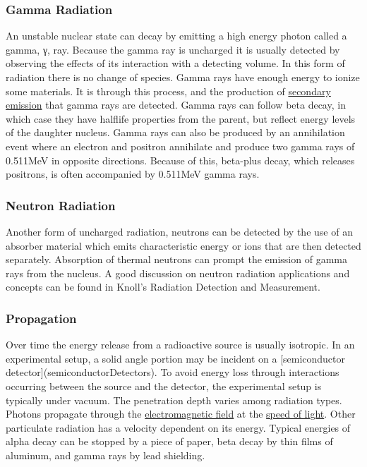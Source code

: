 \documentclass[12pt]{article}
\begin{document}
\begin{doublespacing}
\subsubsection{Gamma Radiation}
An unstable nuclear state can decay by emitting a high energy photon called a gamma, γ, ray. Because the gamma ray is uncharged it is usually detected by observing the effects of its interaction with a detecting volume. In this form of radiation there is no change of species. 
Gamma rays have enough energy to ionize some materials. It is through this process, and the production of \href{https://en.wikipedia.org/wiki/Secondary_emmission}{secondary emission} that gamma rays are detected. Gamma rays can follow beta decay, in which case they have halflife properties from the parent, but reflect energy levels of the daughter nucleus.
Gamma rays can also be produced by an annihilation event where an electron and positron annihilate and produce two gamma rays of 0.511MeV in opposite directions. Because of this, beta-plus decay, which releases positrons, is often accompanied by 0.511MeV gamma rays.

\subsubsection{Neutron Radiation}
Another form of uncharged radiation, neutrons can be detected by the use of an absorber material which emits characteristic energy or ions that are then detected separately.
Absorption of thermal neutrons can prompt the emission of gamma rays from the nucleus.
A good discussion on neutron radiation applications and concepts can be found in Knoll's Radiation Detection and Measurement.

\subsubsection{Propagation}
Over time the energy release from a radioactive source is usually isotropic. In an experimental setup, a solid angle portion may be incident on a [semiconductor detector](semiconductorDetectors). To avoid energy loss through interactions occurring between the source and the detector, the experimental setup is typically under vacuum. 
The penetration depth varies among radiation types. Photons propagate through the \href{https://en.wikipedia.org/wiki/Electromagnetic_field}{electromagnetic field} at the \href{https://en.wikipedia.org/wiki/Speed_of_light}{speed of light}. Other particulate radiation has a velocity dependent on its energy. Typical energies of alpha decay can be stopped by a piece of paper, beta decay by thin films of aluminum, and gamma rays by lead shielding.



\end{doublespacing}
\end{document}

